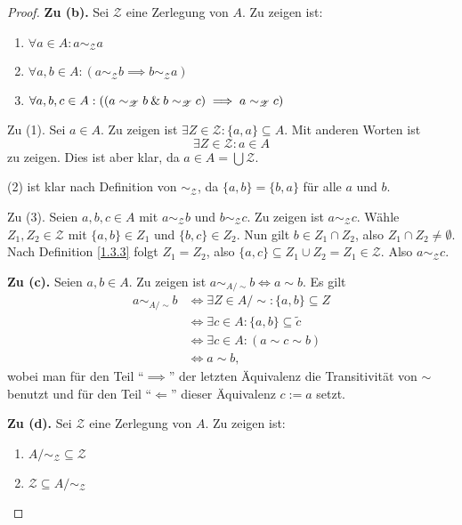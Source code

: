\documentclass[../../main.tex]{subfiles}
\begin{document}
\begin{proof}
\medskip\noindent
{\bf Zu (b).} Sei $\mathcal Z$ eine Zerlegung von $A$. Zu zeigen ist:
\begin{enumerate}[(1)]
\item $\forall a\in A:a\sim_\mathcal Za$
\item $\forall a,b\in A:(a\sim_\mathcal Z b\implies b\sim_\mathcal Z a)$
\item $\forall a,b,c\in A:((a\sim_\mathcal Z b\mathbin{\&} b\sim_\mathcal Z c)\implies a\sim_\mathcal Z c)$
\end{enumerate}

\noindent
Zu (1). Sei $a\in A$. Zu zeigen ist $\exists Z\in\mathcal Z:\{a,a\}\subseteq A$. Mit anderen Worten ist
$$\exists Z\in\mathcal Z:a\in A$$ zu zeigen. Dies ist aber klar, da $a\in A=\bigcup\mathcal Z$.

\smallskip\noindent
(2) ist klar nach Definition von $\sim_\mathcal Z$, da $\{a,b\}=\{b,a\}$ für alle $a$ und $b$.

\smallskip\noindent
Zu (3). Seien $a,b,c\in A$ mit $a\sim_\mathcal Zb$ und $b\sim_\mathcal Zc$. Zu zeigen ist $a\sim_\mathcal Zc$.
Wähle $Z_1,Z_2\in\mathcal Z$ mit $\{a,b\}\in Z_1$ und $\{b,c\}\in Z_2$. Nun gilt $b\in Z_1\cap Z_2$, also
$Z_1\cap Z_2\ne\emptyset$. Nach Definition \ref{1.3.3} folgt $Z_1=Z_2$, also $\{a,c\}\subseteq Z_1\cup Z_2=Z_1\in\mathcal Z$.
Also $a\sim_\mathcal Zc$.

\medskip\noindent
{\bf Zu (c).} Seien $a,b\in A$. Zu zeigen ist $a\sim_{A/\text{$\sim$}}b\iff a\sim b$. Es gilt
\begin{align*}
a\sim_{A/\text{$\sim$}}b&\iff\exists Z\in A/\text{$\sim$}:\{a,b\}\subseteq Z\\
&\iff\exists c\in A:\{a,b\}\subseteq\widetilde c\\
&\iff\exists c\in A:(a\sim c\sim b)\\
&\iff a\sim b,
\end{align*}
wobei man für den Teil "`$\implies$"' der letzten Äquivalenz die Transitivität von $\sim$ benutzt und für den Teil
"`$\Longleftarrow$"' dieser Äquivalenz $c:=a$ setzt.

\medskip\noindent
{\bf Zu (d).} Sei $\mathcal Z$ eine Zerlegung von $A$. Zu zeigen ist:
\begin{enumerate}[(1)]
\item $A/\text{$\sim_\mathcal Z$}\subseteq\mathcal Z$
\item $\mathcal Z\subseteq A/\text{$\sim_\mathcal Z$}$
\end{enumerate}


\end{proof}
\end{document}
